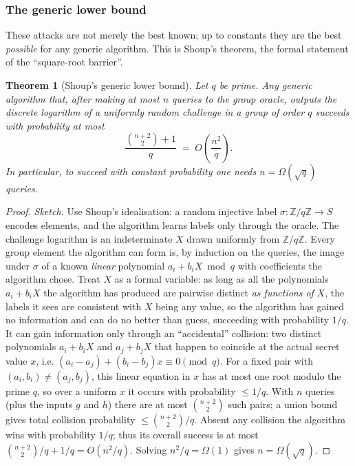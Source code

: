 \documentclass[11pt,a4paper]{article}
\newtheorem{theorem}{Theorem}[section]
\theoremstyle{definition}
\theoremstyle{remark}
\newcommand{\Z}{\ensuremath{\mathbb{Z}}}
\begin{document}
\subsubsection*{The generic lower bound}

These attacks are not merely the best known; up to constants they are the best \emph{possible} for any generic algorithm. This is Shoup's theorem, the formal statement of the ``square-root barrier''.

\begin{theorem}[Shoup's generic lower bound]
\label{assumptions:thm:shoup}
Let \(q\) be prime. Any generic algorithm that, after making at most \(n\) queries to the group oracle, outputs the discrete logarithm of a uniformly random challenge in a group of order \(q\) succeeds with probability at most
\[
\frac{\binom{n+2}{2}+1}{q} \;=\; O\!\left(\frac{n^2}{q}\right).
\]
In particular, to succeed with constant probability one needs \(n = \Omega(\sqrt q)\) queries.
\end{theorem}

\begin{proof}
\emph{Sketch.} Use Shoup's idealisation: a random injective label \(\sigma \colon \Z/q\Z \to S\) encodes elements, and the algorithm learns labels only through the oracle. The challenge logarithm is an indeterminate \(X\) drawn uniformly from \(\Z/q\Z\). Every group element the algorithm can form is, by induction on the queries, the image under \(\sigma\) of a known \emph{linear} polynomial \(a_i + b_i X \bmod q\) with coefficients the algorithm chose. Treat \(X\) as a formal variable: as long as all the polynomials \(a_i + b_i X\) the algorithm has produced are pairwise distinct \emph{as functions of} \(X\), the labels it sees are consistent with \(X\) being any value, so the algorithm has gained no information and can do no better than guess, succeeding with probability \(1/q\). It can gain information only through an ``accidental'' collision: two distinct polynomials \(a_i + b_i X\) and \(a_j + b_j X\) that happen to coincide at the actual secret value \(x\), i.e. \((a_i - a_j) + (b_i - b_j) x \equiv 0 \pmod q\). For a fixed pair with \((a_i,b_i) \ne (a_j,b_j)\), this linear equation in \(x\) has at most one root modulo the prime \(q\), so over a uniform \(x\) it occurs with probability \(\le 1/q\). With \(n\) queries (plus the inputs \(g\) and \(h\)) there are at most \(\binom{n+2}{2}\) such pairs; a union bound gives total collision probability \(\le \binom{n+2}{2}/q\). Absent any collision the algorithm wins with probability \(1/q\); thus its overall success is at most \(\binom{n+2}{2}/q + 1/q = O(n^2/q)\). Solving \(n^2/q = \Omega(1)\) gives \(n = \Omega(\sqrt q)\).
\end{proof}
\end{document}
